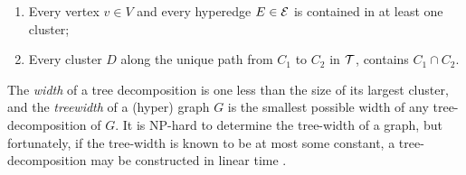 \documentclass[twoside]{article}
\begin{document}
\begin{enumerate}[itemsep=0pt]
    \item Every vertex $v \in V$ and every hyperedge $E \in \mathcal E$ is contained in at least one cluster;
        \item Every cluster $D$ along the unique path from $C_1$ to $C_2$ in $\cal T$,
         contains $C_1 \cap C_2$. 
\end{enumerate}

The \emph{width} of a tree decomposition is one less than the size of its largest cluster,
and the \emph{treewidth} of a (hyper) graph $G$ is the smallest possible width of any tree-decomposition of $G$.
It is NP-hard to determine the tree-width of a graph, but fortunately, if the tree-width is known to be at most some constant, a tree-decomposition may be constructed in linear time \parencite{bodlaender1993linear}.
\end{document}
